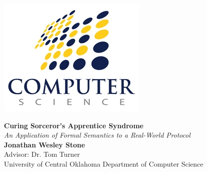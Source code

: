 \documentclass[a0,landscape]{a0poster}
\begin{document}

\begin{figure}[!htb]
\begin{minipage}[b]{0.19\linewidth}
\includegraphics[height=.8\columnwidth,keepaspectratio]{csdept_logo.png} %
\end{minipage}
%
\hspace{9cm}
\begin{minipage}[b]{0.59\linewidth}
\veryHuge \color{NavyBlue} \textbf{Curing Sorceror's Apprentice Syndrome} \color{Black}\\ %
\Huge\textit{An Application of Formal Semantics to a Real-World Protocol}\\[1cm] %
\huge \textbf{Jonathan Wesley Stone}\\ %
\huge Advisor: Dr. Tom Turner\\
\huge University of Central Oklahoma Department of Computer Science\\ %
\end{minipage}
%
\begin{minipage}[b]{0.19\linewidth}

\end{minipage}
\end{figure}
\end{document}
